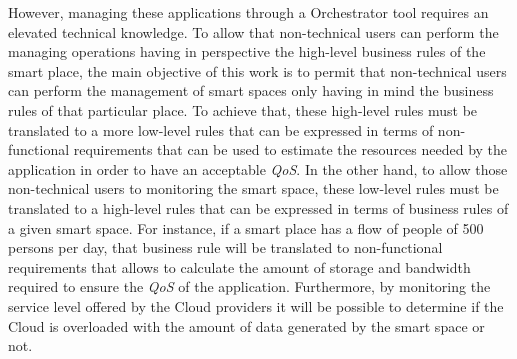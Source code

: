 However, managing these applications through a Orchestrator tool requires an elevated technical knowledge. To allow that non-technical users can perform the
managing operations having in perspective the high-level business rules of the smart place, the main objective of this work is to permit that non-technical users
can perform the management of smart spaces only having in mind the business rules of that particular place. To achieve that, these high-level rules must be translated to
a more low-level rules that can be expressed in terms of non-functional requirements that can be used to estimate the resources needed by the application in order
to have an acceptable \textit{QoS}. In the other hand, to allow those non-technical users to monitoring the smart space, these low-level rules must be translated to
a high-level rules that can be expressed in terms of business rules of a given smart space. For instance, if a smart place has a flow of people of 500 persons per day,
that business rule will be translated to non-functional requirements that allows to calculate the amount of storage and bandwidth required to ensure the \textit{QoS}
of the application. Furthermore, by monitoring the service level offered by the Cloud providers it will be possible to determine if the Cloud is overloaded with the
amount of data generated by the smart space or not.
